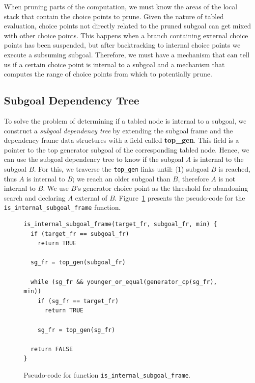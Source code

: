 When pruning parts of the computation, we must know the areas of the local stack
that contain the choice points to prune. Given the nature of tabled evaluation, choice points not
directly related to the pruned subgoal can get mixed with other choice points. This happens when a branch
containing external choice points has been suspended, but after backtracking to internal choice points we
execute a subsuming subgoal. Therefore, we must have a mechanism that can tell us if a certain choice
point is internal to a subgoal and a mechanism that computes the range of choice points from which to potentially
prune.

\subsection{Subgoal Dependency Tree}

To solve the problem of determining if a tabled node is internal to a subgoal,
we construct a \emph{subgoal dependency tree} by extending the subgoal frame and the
dependency frame data structures with a field called \textbf{top\_gen}. This field is a pointer to
the top generator subgoal of the corresponding tabled node.
Hence, we can use the subgoal dependency tree to know if the subgoal $A$ is internal
to the subgoal $B$. For this, we traverse the \texttt{top\_gen} links until:
(1) subgoal $B$ is reached, thus $A$ is internal to $B$; we reach an older subgoal
than $B$, therefore $A$ is not internal to $B$. We use $B$'s generator choice point
as the threshold for abandoning search and declaring $A$ external of $B$.
Figure~\ref{fig:is_internal_subgoal_frame} presents the pseudo-code for the
\texttt{is\_internal\_subgoal\_frame} function.

\begin{figure}[ht]
\begin{Verbatim}
is_internal_subgoal_frame(target_fr, subgoal_fr, min) {
  if (target_fr == subgoal_fr)
    return TRUE
  
  sg_fr = top_gen(subgoal_fr)
  
  while (sg_fr && younger_or_equal(generator_cp(sg_fr), min))
    if (sg_fr == target_fr)
      return TRUE
    
    sg_fr = top_gen(sg_fr)
  
  return FALSE
}
\end{Verbatim}
\caption{Pseudo-code for function \texttt{is\_internal\_subgoal\_frame}.}
\label{fig:is_internal_subgoal_frame}
\end{figure}

